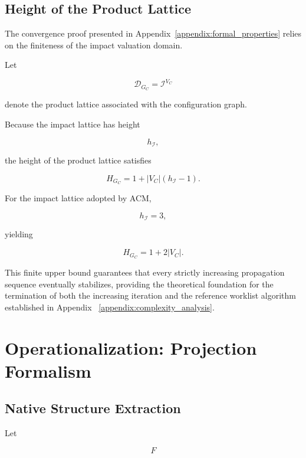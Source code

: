 \documentclass[10pt]{article}
\begin{document}
\subsection{Height of the Product Lattice}
\label{appendix:lattice_height}

The convergence proof presented in Appendix~\ref{appendix:formal_properties}
relies on the finiteness of the impact valuation domain.

Let

\[
\mathcal D_{G_C}
=
\mathcal I^{V_C}
\]

denote the product lattice associated with the configuration graph.

Because the impact lattice has height

\[
h_{\mathcal I},
\]

the height of the product lattice satisfies

\begin{equation}
	\label{eq:product_lattice_height}
	H_{G_C}
	=
	1
	+
	|V_C|
	\left(
	h_{\mathcal I}-1
	\right).
\end{equation}

For the impact lattice adopted by ACM,

\[
h_{\mathcal I}=3,
\]

yielding

\begin{equation}
H_{G_C}
=
1+2|V_C|.
\label{eq:h_equality}
\end{equation}

This finite upper bound guarantees that every strictly increasing propagation sequence eventually stabilizes, providing the theoretical foundation for the termination of both the increasing iteration and the reference worklist algorithm established in Appendix ~\ref{appendix:complexity_analysis}.

\section{Operationalization: Projection Formalism}
\label{appendix:projection_formalism}
\subsection{Native Structure Extraction}

Let

\[
F
\]
\end{document}
